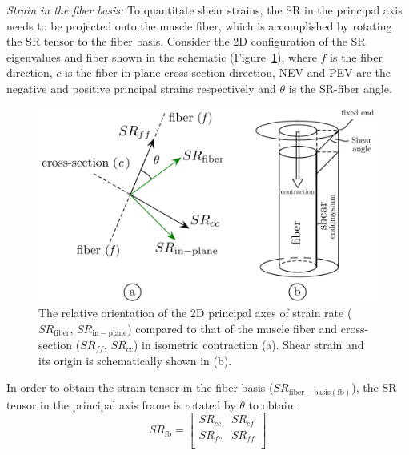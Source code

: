 \textit{Strain in the fiber basis:}
To quantitate shear strains, the SR in the principal axis needs to be projected onto the muscle fiber, which is accomplished by rotating the SR tensor to the fiber basis. 
Consider the 2D configuration of the SR eigenvalues and fiber shown in the schematic (Figure~\ref{fig: SR1_1}), where $f$ is the fiber direction, $c$ is the fiber in-plane cross-section direction, NEV and PEV are the negative and positive principal strains respectively and $\theta$ is the SR-fiber angle. 
\begin{figure}[!htb]
\vspace{+0.2cm}
\centering
\includegraphics[scale=0.62]{Figures/SR2dSchematic.pdf}
\caption[Schematic of strain rate in principal axes and shear strain in muscle during isometric contraction.]{The relative orientation of the 2D principal axes of strain rate ($SR_\mathrm{fiber}$, $SR_\mathrm{in-plane}$) compared to that of the muscle fiber and cross-section ($SR_{ff}$, $SR_{cc}$) in isometric contraction (a). Shear strain and its origin is schematically shown in (b).}
\label{fig: SR1_1}
\end{figure}
In order to obtain the strain tensor in the fiber basis ($SR_{\mathrm{fiber-basis(fb)}}$), the SR tensor in the principal axis frame is rotated by $\theta$ to obtain:
\begin{equation}\label{eq: SR fiber basis}
SR_{\mathrm{fb}} = \left [
\begin{matrix}
SR_{cc} & SR_{cf}\\
SR_{fc} & SR_{ff}\\
\end{matrix} \right]
\end{equation}
